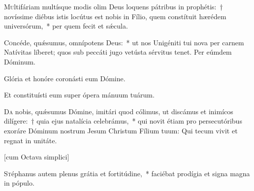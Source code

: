 \documentclass[vesperale_romanum.tex]{subfiles}
\begin{document}
\lettrine{M}{u}ltifáriam multísque modis olim Deus loquens pátribus in prophétis:~† novíssime diébus istis locútus est nobis in Fílio, quem constítuit hærédem universórum,~* per quem fecit et sǽcula.




\admagnificat \label{hodie_christus_natus_est}

\oratio


\lettrine{C}{o}ncéde, quǽsumus, omnípotens Deus:~* ut nos Unigéniti tui nova per carnem Natívitas líberet; quos sub peccáti jugo vetústa sérvitus tenet.
Per eúmdem Dóminum.




\vv Glória et honóre coronásti eum Dómine.

\rr Et constituísti eum super ópera mánuum tuárum.

\oratio \label{oratio_s_stephani_dec_26}

\lettrine{D}{a} nobis, quǽsumus Dómine, imitári quod cólimus, ut discámus et inimícos dilígere:~† quia ejus natalícia celebrámus,~* qui novit étiam pro persecutóribus exoráre Dóminum nostrum Jesum Christum Fílium tuum: Qui tecum vivit et regnat in unitáte.

 \label{dec_26}


[cum Octava simplici]



\lettrine{S}{t}éphanus autem plenus grátia et fortitúdine,~* faciébat prodígia et signa magna in pópulo.
\end{document}
